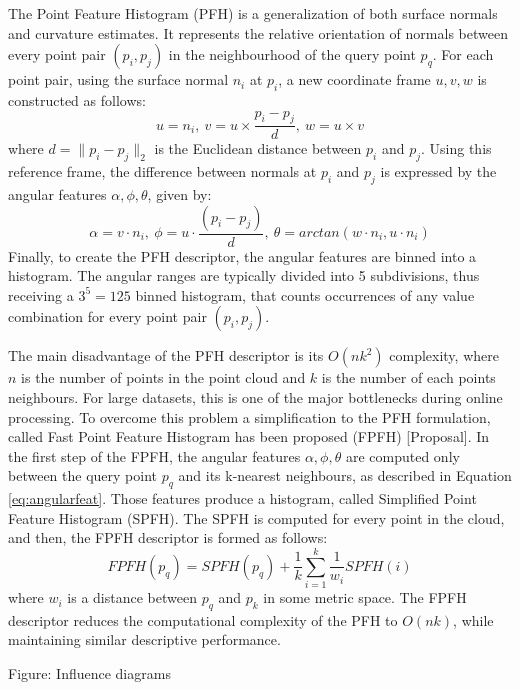 The Point Feature Histogram (PFH) is a generalization of both surface normals and curvature estimates. It represents the relative orientation of normals between every point pair $(p_i,p_j)$ in the neighbourhood of the query point $p_q$. For each point pair, using the surface normal $n_i$ at $p_i$, a new coordinate frame $u,v,w$ is constructed as follows:
\begin{equation}
u = n_i,\  v = u \times \frac{p_i-p_j}{d},\  w = u \times v
\end{equation}
where $d = \|p_i-p_j\|_2$ is the Euclidean distance between $p_i$ and $p_j$. Using this reference frame, the difference between normals at $p_i$ and $p_j$ is expressed by the angular features $\alpha, \phi, \theta$, given by:
\begin{equation}
\label{eq:angularfeat}
\alpha = v \cdot n_i, \  \phi = u \cdot \frac{(p_i-p_j)}{d}, \ \theta = arctan(w\cdot n_i, u \cdot n_i)
\end{equation}
Finally, to create the PFH descriptor, the angular features are binned into a histogram. The angular ranges are typically divided into 5 subdivisions, thus receiving a $3^5=125$ binned histogram, that counts occurrences of any value combination for every point pair $(p_i, p_j)$.

The main disadvantage of the PFH descriptor is its $O(nk^2)$ complexity, where $n$ is the number of points in the point cloud and $k$ is the number of each points neighbours. For large datasets, this is one of the major bottlenecks during online processing. To overcome this problem a simplification to the PFH formulation, called Fast Point Feature Histogram has been proposed (FPFH) [Proposal]. In the first step of the FPFH, the angular features $\alpha, \phi, \theta$ are computed only between the query point $p_q$ and its k-nearest neighbours, as described in Equation \ref{eq:angularfeat}. Those features produce a histogram, called Simplified Point Feature Histogram (SPFH). 	The SPFH is computed for every point in the cloud, and then, the FPFH descriptor is formed as follows:
\begin{equation}
FPFH(p_q) = SPFH(p_q) + \frac{1}{k}\sum\limits_{i=1}^k\frac{1}{w_i}SPFH(i)
\end{equation}
where $w_i$ is a distance between $p_q$ and $p_k$ in some metric space. The FPFH descriptor reduces the computational complexity of the PFH to $O(nk)$, while maintaining similar descriptive performance.

Figure: Influence diagrams

